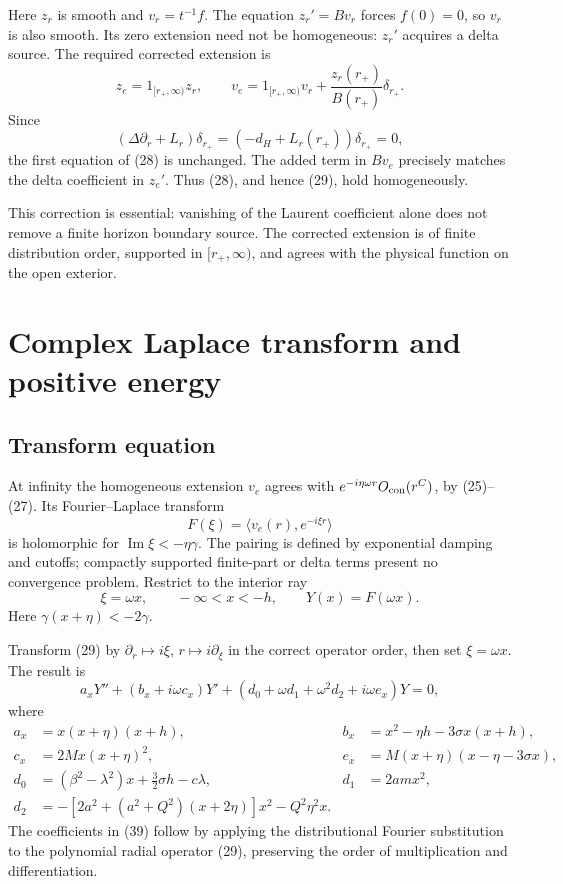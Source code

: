 \documentclass[
  10pt,
  a4paper,
]{article}
\begin{document}
Here \(z_r\) is smooth and \(v_r=t^{-1}f\). The equation \(z_r'=Bv_r\)
forces \(f(0)=0\), so \(v_r\) is also smooth. Its zero extension need
not be homogeneous: \(z_r'\) acquires a delta source. The required
corrected extension is \[
 z_e=1_{[r_+,\infty)}z_r,\qquad
 v_e=1_{[r_+,\infty)}v_r+
       \frac{z_r(r_+)}{B(r_+)}\delta_{r_+}.
 \tag{35}
\] Since \[
 (\Delta\partial_r+L_r)\delta_{r_+}
 =(-d_H+L_r(r_+))\delta_{r_+}=0,
\] the first equation of (28) is unchanged. The added term in \(Bv_e\)
precisely matches the delta coefficient in \(z_e'\). Thus (28), and
hence (29), hold homogeneously.

This correction is essential: vanishing of the Laurent coefficient alone
does not remove a finite horizon boundary source. The corrected
extension is of finite distribution order, supported in
\([r_+,\infty)\), and agrees with the physical function on the open
exterior.

\section{Complex Laplace transform and positive
energy}\label{complex-laplace-transform-and-positive-energy}

\subsection{Transform equation}\label{transform-equation}

At infinity the homogeneous extension \(v_e\) agrees with
\(e^{-i\eta\omega r}O_{\rm con}(r^C)\), by (25)--(27). Its
Fourier--Laplace transform \[
 F(\xi)=\langle v_e(r),e^{-i\xi r}\rangle
 \tag{36}
\] is holomorphic for \(\operatorname{Im}\xi<-\eta\gamma\). The pairing
is defined by exponential damping and cutoffs; compactly supported
finite-part or delta terms present no convergence problem. Restrict to
the interior ray \[
 \xi=\omega x,\qquad -\infty<x<-h,\qquad Y(x)=F(\omega x).
 \tag{37}
\] Here \(\gamma(x+\eta)<-2\gamma\).

Transform (29) by \(\partial_r\mapsto i\xi\), \(r\mapsto i\partial_\xi\)
in the correct operator order, then set \(\xi=\omega x\). The result is
\[
 a_xY''+(b_x+i\omega c_x)Y'
 +(d_0+\omega d_1+\omega^2d_2+i\omega e_x)Y=0,
 \tag{38}
\] where \[
\begin{aligned}
 a_x&=x(x+\eta)(x+h),&
 b_x&=x^2-\eta h-3\sigma x(x+h),\\
 c_x&=2Mx(x+\eta)^2,&
 e_x&=M(x+\eta)(x-\eta-3\sigma x),\\
 d_0&=(\beta^2-\lambda^2)x+\tfrac32\sigma h-c\lambda,&
 d_1&=2amx^2,\\
 d_2&=-[2a^2+(a^2+Q^2)(x+2\eta)]x^2-Q^2\eta^2x .
\end{aligned}
 \tag{39}
\] The coefficients in (39) follow by applying the distributional
Fourier substitution to the polynomial radial operator (29), preserving
the order of multiplication and differentiation.
\end{document}
